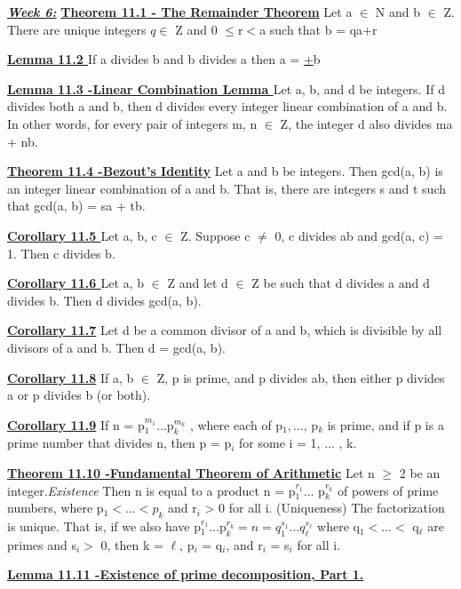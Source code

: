 \documentclass[10pt]{article}
\begin{document}
\par\textbf{\underline{\textit{Week 6:}}}
\textbf{\underline{Theorem 11.1 - The Remainder Theorem}}
Let a $\in$ N and b $\in$ Z. There are unique integers $q \in$ Z and 0 $\leq$r$<$a such that
b = qa+r
\par\textbf{\underline{Lemma 11.2 }}
If a divides b and b divides a then a = \underline{+}b
\par\textbf{\underline{Lemma 11.3 -Linear Combination Lemma }}
Let a, b, and d be integers. If d divides both
a and b, then d divides every integer linear combination of a and b. In other words, for
every pair of integers m, n $\in$ Z, the integer d also divides ma + nb.
\par\textbf{\underline{Theorem 11.4 -Bezout's Identity}}
Let a and b be integers. Then gcd(a, b) is an integer
linear combination of a and b. That is, there are integers s and t such that gcd(a, b) =
sa + tb.
\par\textbf{\underline{Corollary 11.5 }}
Let a, b, c $\in$ Z. Suppose c $\neq$ 0, c divides ab and gcd(a, c) = 1. Then c
divides b.
\par\textbf{\underline{Corollary 11.6 }}
Let a, b $\in$ Z and let d $\in$ Z be such that d divides a and d divides b. Then d
divides gcd(a, b).
\par\textbf{\underline{Corollary 11.7}}
Let d be a common divisor of a and b, which is divisible by all divisors
of a and b. Then d = \underbar{+}gcd(a, b).
\par\textbf{\underline{Corollary 11.8}}
If a, b $\in$ Z, p is prime, and p divides ab, then either p divides a or p divides
b (or both).
\par\textbf{\underline{Corollary 11.9}}
If n = p$_1^{m_1} \dots \mbox{p}_k^{m_k} $
, where each of p$_1, \dots $, p$_k $ is prime, and if p is a prime 
number that divides n, then p = p$_i$ for some i = 1, $\dots$ , k.
\par\textbf{\underline{Theorem 11.10 -Fundamental Theorem of Arithmetic}}
Let n $\geq$ 2 be an integer.\textit{Existence} Then n is equal to a product n = p$_1^{r_1}
 \dots $ p$_k^{r_k}$
of powers of prime numbers,
where p$_1 < \dots < p_k$ and r$_i$ > 0 for all i.
(Uniqueness) The factorization is unique. That is, if we also have
p$_1^{r_1} \dots \mbox{p}_k^{r_k}
= n = q_1^{s_1}
 \dots q_{\ell}^{s_\ell}$
 where q$_1 < \dots <$ q$_\ell$ are primes and s$_i >$ 0, then k = $\ell$, p$_i$ = q$_i$, and r$_i$ = s$_i$ for all i.
 \par\textbf{\underline{Lemma 11.11 -Existence of prime decomposition, Part 1.}}
\end{document}
